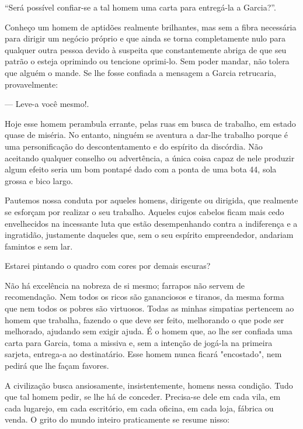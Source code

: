 ``Será possível confiar-se a tal homem uma carta para entregá-la a Garcia?''.

Conheço um homem de aptidões realmente brilhantes, mas sem a fibra necessária para dirigir um negócio próprio e que ainda se torna completamente nulo para qualquer outra pessoa devido à suspeita que constantemente abriga de que seu patrão o esteja oprimindo ou tencione oprimi-lo. Sem poder mandar, não tolera que alguém o mande. Se lhe fosse confiada a mensagem a Garcia retrucaria, provavelmente:

--–  Leve-a você mesmo!.

Hoje esse homem perambula errante, pelas ruas em busca de trabalho, em estado quase de miséria. No entanto, ninguém se aventura a dar-lhe trabalho porque é uma personificação do descontentamento e do espírito da discórdia. Não aceitando qualquer conselho ou advertência, a única coisa capaz de nele produzir algum efeito seria um bom pontapé dado com a ponta de uma bota 44, sola grossa e bico largo.

Pautemos nossa conduta por aqueles homens, dirigente ou dirigida, que realmente se esforçam por realizar o seu trabalho. Aqueles cujos cabelos ficam mais cedo envelhecidos na incessante luta que estão desempenhando contra a indiferença e a ingratidão, justamente daqueles que, sem o seu espírito empreendedor, andariam famintos e sem lar.

Estarei pintando o quadro com cores por demais escuras?

Não há excelência na nobreza de si mesmo; farrapos não servem de recomendação. Nem todos os ricos são gananciosos e tiranos, da mesma forma que nem todos os pobres são virtuosos. Todas as minhas simpatias pertencem ao homem que trabalha, fazendo o que deve ser feito, melhorando o que pode ser melhorado, ajudando sem exigir ajuda. É o homem que, ao lhe ser confiada uma carta para Garcia, toma a missiva e, sem a intenção de jogá-la na primeira sarjeta, entrega-a ao destinatário. Esse homem nunca ficará "encostado", nem pedirá que lhe façam favores.

A civilização busca ansiosamente, insistentemente, homens nessa condição. Tudo que tal homem pedir, se lhe há de conceder. Precisa-se dele em cada vila, em cada lugarejo, em cada escritório, em cada oficina, em cada loja, fábrica ou venda. O grito do mundo inteiro praticamente se resume nisso:

